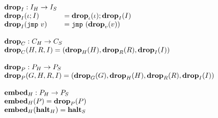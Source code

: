 {\[\begin{array}{l}
\begin{array}{ll}
\mathbf{drop}_{I} : {I_H} -> {I_S} \\
\mathbf{drop}_{I}(\iota ; I) &= \mathbf{drop}_{\iota}(\iota) ; \mathbf{drop}_{I}(I) \\
\mathbf{drop}_{I}(\mathtt{jmp}\ v) &= \mathtt{jmp}\ (\mathbf{drop}_{v}(v))
\end{array} \\\\

\begin{array}{l}
\mathbf{drop}_{C} : {C_H} -> {C_S} \\
\mathbf{drop}_{C}(H, R, I) = (\mathbf{drop}_{H}(H), \mathbf{drop}_{R}(R), \mathbf{drop}_{I}(I)) \\\\

\mathbf{drop}_{P} : {P_H} -> {P_S} \\
\mathbf{drop}_{P}(G, H, R, I) = (\mathbf{drop}_{G}(G), \mathbf{drop}_{H}(H), \mathbf{drop}_{R}(R), \mathbf{drop}_{I}(I)) \\\\

{{\mathbf{embed}}_H} : {P_H} -> {P_S} \\
{{\mathbf{embed}}_H}(P) = \mathbf{drop}_{P}(P) \\
{{\mathbf{embed}}_H}({\mathbf{halt}_H}) = {\mathbf{halt}_S} \\
\end{array} \\\\

\end{array}\]
}
